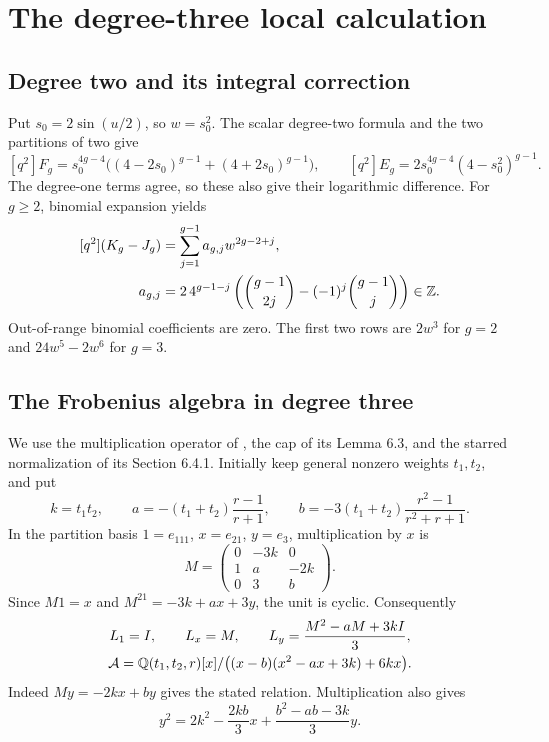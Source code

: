 \section{The degree-three local calculation}\label{sec:local}

\subsection{Degree two and its integral correction}
Put $s_0=2\sin(u/2)$, so $w=s_0^2$. The scalar degree-two formula
\cite[Section 8]{BP} and the two partitions of two give
\[
 [q^2]F_g=s_0^{4g-4}\bigl((4-2s_0)^{g-1}+(4+2s_0)^{g-1}\bigr),
 \qquad [q^2]E_g=2s_0^{4g-4}(4-s_0^2)^{g-1}.
\]
The degree-one terms agree, so these also give their logarithmic
difference. For $g\ge2$, binomial expansion yields
\begin{equation}\label{eq:degree-two}
 \begin{split}
 [q^2](K_g-J_g)&=\sum_{j=1}^{g-1}a_{g,j}w^{2g-2+j},\\
 a_{g,j}&=2\,4^{g-1-j}
 \left(\binom{g-1}{2j}-(-1)^j\binom{g-1}{j}\right)\in\mathbb Z.
 \end{split}
\end{equation}
Out-of-range binomial coefficients are zero. The first two rows are
$2w^3$ for $g=2$ and $24w^5-2w^6$ for $g=3$.

\subsection{The Frobenius algebra in degree three}
We use the multiplication operator of
\cite[Appendix, equations (29) and (31)]{BP}, the cap of its Lemma 6.3,
and the starred normalization of its Section 6.4.1.
Initially keep general nonzero weights $t_1,t_2$, and put
\[
 k=t_1t_2,\qquad
 a=-(t_1+t_2)\frac{r-1}{r+1},\qquad
 b=-3(t_1+t_2)\frac{r^2-1}{r^2+r+1}.
\]
In the partition basis $1=e_{111}$, $x=e_{21}$, $y=e_3$,
multiplication by $x$ is
\begin{equation}\label{eq:M}
 M=\begin{pmatrix}0&-3k&0\\1&a&-2k\\0&3&b\end{pmatrix}.
\end{equation}
Since $M1=x$ and $M^21=-3k+ax+3y$, the unit is cyclic. Consequently
\begin{equation}\label{eq:algebra}
 \begin{gathered}
 L_1=I,\qquad L_x=M,\qquad L_y=\frac{M^2-aM+3kI}{3},\\
 \mathcal A=\mathbb Q(t_1,t_2,r)[x]/\bigl((x-b)(x^2-ax+3k)+6kx\bigr).
 \end{gathered}
\end{equation}
Indeed $My=-2kx+by$ gives the stated relation. Multiplication also gives
\[
 y^2=2k^2-\frac{2kb}{3}x+\frac{b^2-ab-3k}{3}y.
\]

